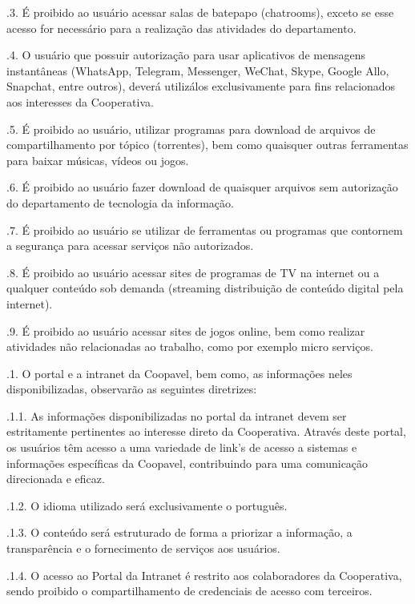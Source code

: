 \documentclass[letterpaper,10pt,portuges]{sphinxmanual}
\begin{document}
.3. É proibido ao usuário acessar salas de bate\sphinxhyphen{}papo (chatrooms), exceto se esse acesso for necessário para a realização das atividades do departamento.

.4. O usuário que possuir autorização para usar aplicativos de mensagens instantâneas (WhatsApp, Telegram, Messenger, WeChat, Skype, Google Allo, Snapchat, entre outros), deverá utilizá\sphinxhyphen{}los exclusivamente para fins relacionados aos interesses da Cooperativa.

.5. É proibido ao usuário, utilizar programas para download de arquivos de compartilhamento por tópico (torrentes), bem como quaisquer outras ferramentas para baixar músicas, vídeos ou jogos.

.6. É proibido ao usuário fazer download de quaisquer arquivos sem autorização do departamento de tecnologia da informação.

.7. É proibido ao usuário se utilizar de ferramentas ou programas que contornem a segurança para acessar serviços não autorizados.

.8. É proibido ao usuário acessar sites de programas de TV na internet ou a qualquer conteúdo sob demanda (streaming \sphinxhyphen{} distribuição de conteúdo digital pela internet).

.9. É proibido ao usuário acessar sites de jogos online, bem como realizar atividades não relacionadas ao trabalho, como por exemplo micro serviços.

.1. O portal e a intranet da Coopavel, bem como, as informações neles disponibilizadas, observarão as seguintes diretrizes:

.1.1. As informações disponibilizadas no portal da intranet devem ser estritamente pertinentes ao interesse direto da Cooperativa. Através deste portal, os usuários têm acesso a uma variedade de link’s de acesso a sistemas e informações específicas da Coopavel, contribuindo para uma comunicação direcionada e eficaz.

.1.2. O idioma utilizado será exclusivamente o português.

.1.3. O conteúdo será estruturado de forma a priorizar a informação, a transparência e o fornecimento de serviços aos usuários.

.1.4. O acesso ao Portal da Intranet é restrito aos colaboradores da Cooperativa, sendo proibido o compartilhamento de credenciais de acesso com terceiros.
\end{document}
